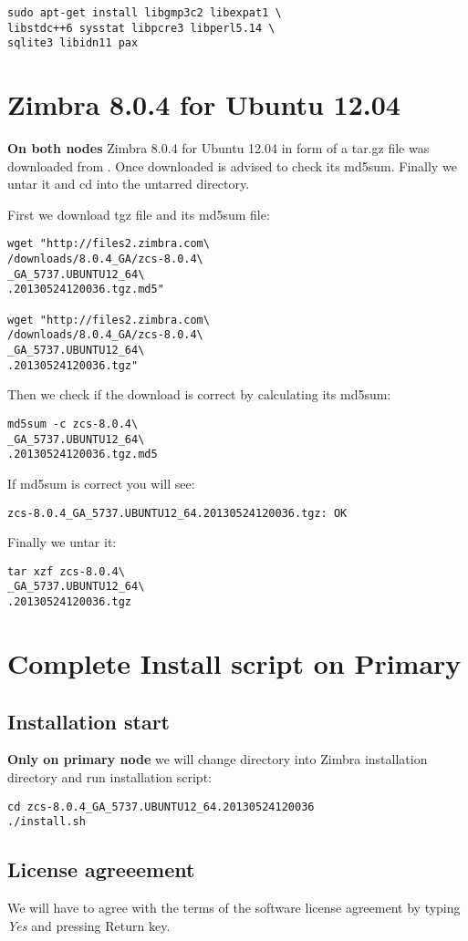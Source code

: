 \begin{verbatim}
sudo apt-get install libgmp3c2 libexpat1 \
libstdc++6 sysstat libpcre3 libperl5.14 \
sqlite3 libidn11 pax
\end{verbatim}

\section {Zimbra 8.0.4 for Ubuntu 12.04}
\textbf{On both nodes}
Zimbra 8.0.4 for Ubuntu 12.04 in form of a tar.gz file was downloaded from \cite{Zimbra8Download}.
Once downloaded is advised to check its md5sum. Finally we untar it and cd into the untarred directory.

First we download tgz file and its md5sum file:
\begin{verbatim}
wget "http://files2.zimbra.com\
/downloads/8.0.4_GA/zcs-8.0.4\
_GA_5737.UBUNTU12_64\
.20130524120036.tgz.md5"

wget "http://files2.zimbra.com\
/downloads/8.0.4_GA/zcs-8.0.4\
_GA_5737.UBUNTU12_64\
.20130524120036.tgz"
\end{verbatim}
Then we check if the download is correct by calculating its md5sum:
\begin{verbatim}
md5sum -c zcs-8.0.4\
_GA_5737.UBUNTU12_64\
.20130524120036.tgz.md5
\end{verbatim}
If md5sum is correct you will see:
\begin{verbatim}
zcs-8.0.4_GA_5737.UBUNTU12_64.20130524120036.tgz: OK
\end{verbatim}
Finally we untar it:
\begin{verbatim}
tar xzf zcs-8.0.4\
_GA_5737.UBUNTU12_64\
.20130524120036.tgz
\end{verbatim}

\section {Complete Install script on Primary}
\subsection {Installation start}
\textbf{Only on primary node} we will change directory into Zimbra installation directory and run installation script:

\begin{verbatim}
cd zcs-8.0.4_GA_5737.UBUNTU12_64.20130524120036
./install.sh
\end{verbatim}
\subsection {License agreeement}
We will have to agree with the terms of the software license agreement by typing \textit{Yes} and pressing Return key.

